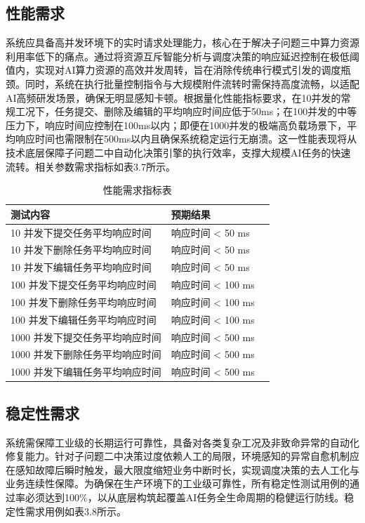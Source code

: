 \subsection{性能需求}

系统应具备高并发环境下的实时请求处理能力，核心在于解决子问题三中算力资源利用率低下的痛点。通过将资源互斥智能分析与调度决策的响应延迟控制在极低阈值内，实现对AI算力资源的高效并发周转，旨在消除传统串行模式引发的调度瓶颈。同时，系统在执行批量控制指令与大规模附件流转时需保持高度流畅，以适配AI高频研发场景，确保无明显感知卡顿。根据量化性能指标要求，在10并发的常规工况下，任务提交、删除及编辑的平均响应时间应低于50ms；在100并发的中等压力下，响应时间应控制在100ms以内；即便在1000并发的极端高负载场景下，平均响应时间也需限制在500ms以内且确保系统稳定运行无崩溃。这一性能表现将从技术底层保障子问题二中自动化决策引擎的执行效率，支撑大规模AI任务的快速流转。相关参数需求指标如表3.7所示。

\begin{table}[htbp]
\centering
\caption{性能需求指标表}
\begin{tabular}{lll}
\toprule
测试内容 & 预期结果 \\
\midrule
10 并发下提交任务平均响应时间 & 响应时间 < 50 ms \\
10 并发下删除任务平均响应时间 & 响应时间 < 50 ms \\
10 并发下编辑任务平均响应时间 & 响应时间 < 50 ms \\
100 并发下提交任务平均响应时间 & 响应时间 < 100 ms \\
100 并发下删除任务平均响应时间 & 响应时间 < 100 ms \\
100 并发下编辑任务平均响应时间 & 响应时间 < 100 ms \\
1000 并发下提交任务平均响应时间 & 响应时间 < 500 ms \\
1000 并发下删除任务平均响应时间 & 响应时间 < 500 ms \\
1000 并发下编辑任务平均响应时间 & 响应时间 < 500 ms \\
\bottomrule
\end{tabular}
\label{tab:perf_concurrent}
\end{table}

\subsection{稳定性需求}

系统需保障工业级的长期运行可靠性，具备对各类复杂工况及非致命异常的自动化修复能力。针对子问题二中决策过度依赖人工的局限，环境感知的异常自愈机制应在感知故障后瞬时触发，最大限度缩短业务中断时长，实现调度决策的去人工化与业务连续性保障。为确保在生产环境下的工业级可靠性，所有稳定性测试用例的通过率必须达到100\%，以从底层构筑起覆盖AI任务全生命周期的稳健运行防线。稳定性需求用例如表3.8所示。

